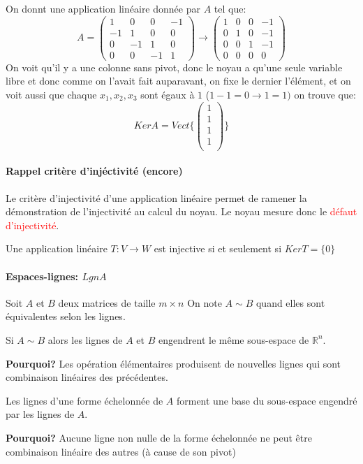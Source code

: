 \begin{exemple}
    On donnt une application linéaire donnée par $A$ tel que:
    \[A = \begin{pmatrix}
        1 & 0 & 0 & -1\\
        -1 & 1 & 0 & 0\\
        0 & -1 & 1 & 0 \\
        0 & 0 & -1 & 1
    \end{pmatrix} \to \begin{pmatrix}
         1 & 0 & 0 & -1\\
        0 & 1 & 0 & -1\\
        0 & 0 & 1 & -1 \\
        0 & 0 & 0 & 0
    \end{pmatrix}\]
    On voit qu'il y a une colonne sans pivot, donc le noyau a qu'une seule variable libre et donc comme on l'avait fait auparavant, on fixe le dernier l'élément, et on voit aussi que chaque $x_1, x_2, x_3$ sont égaux à $1$ ($1 -1  = 0 \to 1 = 1)$ on trouve que:
    \[Ker A = Vect\{\begin{pmatrix}
        1 \\ 1 \\1 \\1 \\
    \end{pmatrix}\}\]
    
\end{exemple}

\paragraph{Rappel critère d'injéctivité (encore)}
Le critère d'injectivité d'une application linéaire permet de ramener la démonstration de l'injectivité au calcul du noyau. Le noyau mesure donc le \textcolor{red}{défaut d'injectivité}.
\begin{theoreme}
    Une application linéaire $T: V \to W$ est injective si et seulement si $Ker T = \{0\}$ 
\end{theoreme}
\paragraph{Espaces-lignes: $LgnA$}
Soit $A$ et $B$ deux matrices de taille $m\times n$ On note $A  \sim B$ quand elles sont équivalentes selon les lignes.
\begin{theoreme}
    Si $A \sim B$ alors les lignes de $A$ et $B$ engendrent le même sous-espace de $\mathbb{R}^n$.   
\end{theoreme}
\textbf{Pourquoi?} Les opération élémentaires produisent de nouvelles lignes qui sont combinaison linéaires des précédentes.
\begin{theoreme}
    Les lignes d'une forme échelonnée de $A$ forment une base du sous-espace engendré par les lignes de $A$.
\end{theoreme}
\textbf{Pourquoi?} Aucune ligne non nulle de la forme échelonnée ne peut être combinaison linéaire des autres (à cause de son pivot)

